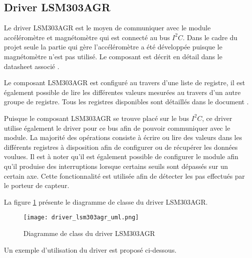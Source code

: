 \subsection{Driver LSM303AGR}

Le driver LSM303AGR est le moyen de communiquer avec le module accéléromètre et magnétomètre qui est connecté au bus $I^{2}C$. Dans le cadre du projet seule la partie qui gère l'accéléromètre a été développée puisque le magnétomètre n'est pas utilisé. Le composant est décrit en détail dans le datasheet associé \cite{lsm303agr-datasheet}.

Le composant LSM303AGR est configuré au travers d'une liste de registre, il est également possible de lire les différentes valeurs mesurées au travers d'un autre groupe de registre. Tous les registres disponibles sont détaillés dans le document \cite[p.~43]{lsm303agr-datasheet}.

Puisque le composant LSM303AGR se trouve placé sur le bus $I^{2}C$, ce driver utilise également le driver pour ce bus afin de pouvoir communiquer avec le module. La majorité des opérations consiste à écrire ou lire des valeurs dans les différents registres à disposition afin de configurer ou de récupérer les données voulues. Il est à noter qu'il est également possible de configurer le module afin qu'il produise des interruptions lorsque certains seuils sont dépassés sur un certain axe. Cette fonctionnalité est utilisée afin de détecter les pas effectués par le porteur de capteur.

La figure \ref{fig:driver_lsm303agr_uml} présente le diagramme de classe du driver LSM303AGR.

\begin{figure}[htb]
\centering 
\texttt{[image: driver\_lsm303agr\_uml.png]} 
\caption{Diagramme de class du driver LSM303AGR}
\label{fig:driver_lsm303agr_uml}
\end{figure}

Un exemple d'utilisation du driver est proposé ci-dessous.

